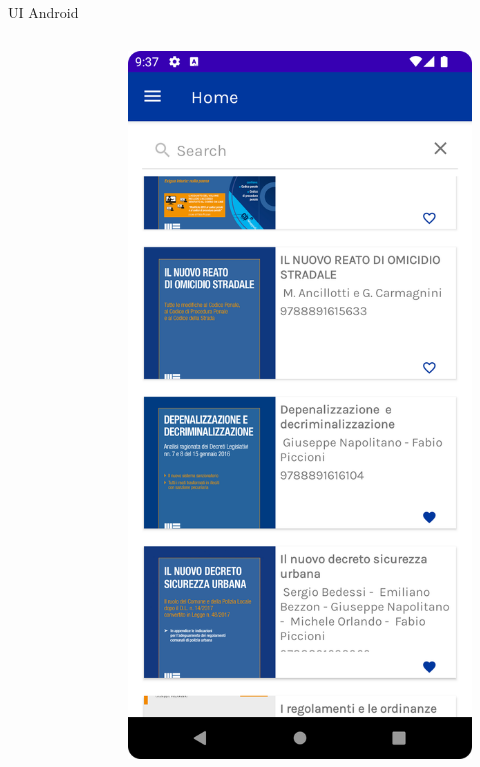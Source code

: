 \begin{frame}{UI Android}
\begin{columns}[onlytextwidth]
\begin{column}{0.24\textwidth}
\begin{figure}[H]
            \end{figure}
        \end{column}
        \begin{column}{0.24\textwidth}
             \begin{figure}[H]
                \includegraphics[width=1\textwidth]{img/home.png}

\end{figure}
\end{column}
\end{columns}
\end{frame}

